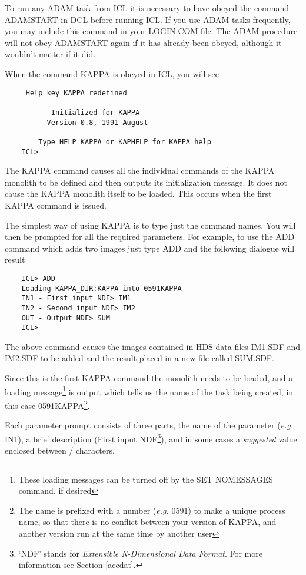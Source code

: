 \documentclass[twoside,11pt]{report}
\begin{document}
To run any ADAM task from ICL it is necessary to have obeyed the command
ADAMSTART in DCL before running ICL.
If you use ADAM tasks frequently, you may include this command in your
LOGIN.COM file. The ADAM procedure will not obey ADAMSTART again if it has
already been obeyed, although it wouldn't matter if it did.

When the command KAPPA is obeyed in ICL, you will see

\begin{verbatim}
     Help key KAPPA redefined

     --    Initialized for KAPPA   --
     --   Version 0.8, 1991 August --

        Type HELP KAPPA or KAPHELP for KAPPA help
    ICL>
\end{verbatim}

The KAPPA command causes all the individual commands of the KAPPA monolith
to be defined and then outputs its initialization message. It does not cause
the KAPPA monolith itself to be loaded. This occurs when the first KAPPA
command is issued.

The simplest way of using KAPPA is to type just the command names. You will
then be prompted for all the required parameters. For example, to use the
ADD command which adds two images just type ADD and the following dialogue
will result

\begin{verbatim}
    ICL> ADD
    Loading KAPPA_DIR:KAPPA into 0591KAPPA
    IN1 - First input NDF> IM1
    IN2 - Second input NDF> IM2
    OUT - Output NDF> SUM
    ICL>
\end{verbatim}

The above command causes the images contained in HDS data files IM1.SDF
and IM2.SDF to be added and the result placed in a new file called SUM.SDF.

Since this is the first KAPPA command the monolith needs to be loaded, and a
loading message\footnote{These loading messages can be turned off by the SET
NOMESSAGES command, if desired} is output which tells us the name of the task
being created, in this case 0591KAPPA\footnote{The name is prefixed with a
number ({\em e.g.} 0591) to make a unique process name, so that there is no conflict
between your version of KAPPA, and another version run at the same time by
another user}.

Each parameter prompt consists of three parts, the name of the
parameter ({\em e.g.} IN1), a brief description (First input NDF\footnote{
`NDF' stands for {\em Extensible N-Dimensional Data Format}. For more
information see Section \ref{accdat}.}), and in some
cases a {\em suggested} value enclosed between / characters.
\end{document}

